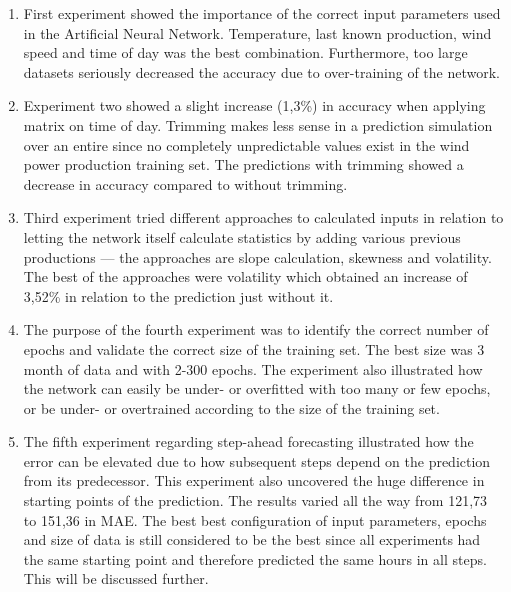 \begin{enumerate}
\item First experiment showed the importance of the correct input parameters used in the Artificial Neural Network. Temperature, last known production, wind speed and time of day was the best combination. Furthermore, too large datasets seriously decreased the accuracy due to over-training of the network.
\item Experiment two showed a slight increase (1,3\%) in accuracy when applying matrix on time of day. Trimming makes less sense in a prediction simulation over an entire since no completely unpredictable values exist in the wind power production training set. The predictions with trimming showed a decrease in accuracy compared to without trimming.
\item Third experiment tried different approaches to calculated inputs in relation to letting the network itself calculate statistics by adding various previous productions --- the approaches are slope calculation, skewness and volatility. The best of the approaches were volatility which obtained an increase of 3,52\% in relation to the prediction just without it.
\item The purpose of the fourth experiment was to identify the correct number of epochs and validate the correct size of the training set. The best size was 3 month of data and with 2-300 epochs. The experiment also illustrated how the network can easily be under- or overfitted with too many or few epochs, or be under- or overtrained  according to the size of the training set.
\item The fifth experiment regarding step-ahead forecasting illustrated how the error can be elevated due to how subsequent steps depend on the prediction from its predecessor. This experiment also uncovered the huge difference in starting points of the prediction. The results varied all the way from 121,73 to 151,36 in MAE. The best best configuration of input parameters, epochs and size of data is still considered to be the best since all experiments had the same starting point and therefore predicted the same hours in all steps. This will be discussed further.
\end{enumerate}

